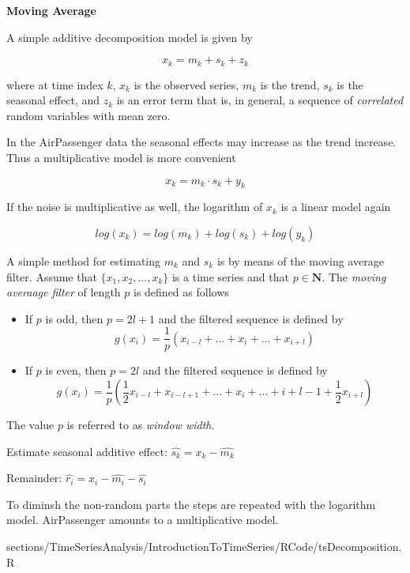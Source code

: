		\RTheory
		{
			\textbf{Moving Average}
			
			\vfill
			
			A simple additive decomposition model is given by
			
			$$x_k = m_k + s_k + z_k $$
			
			where at time index $k$, $x_k$ is the observed series, $m_k$ is the trend,  $s_k$ is the seasonal effect, and $z_k$ is an error term that is, in general, a sequence of \textit{correlated} random variables with mean zero.
			
			\vfill
			
			\hfill
			
			\break
			
			In the AirPassenger data the seasonal effects may increase as the trend increase. Thus a multiplicative model is more convenient
			
			$$ x_k = m_k \cdot s_k + y_k $$
			
			If the noise is multiplicative as well, the logarithm of $x_k$ is a linear model again
			
			$$log(x_k) = log(m_k) + log(s_k) + log(y_k) $$
			
			A simple method for estimating $m_k$ and $s_k$ is by means of the moving average filter. Assume that $\{x_1,x_2,...,x_k \}$ is a time series and that $p \in \mathbf{N}$. The \textit{moving averaage filter} of length $p$ is defined as follows
			
			\begin{itemize}
				\item  If $p$ is odd, then $p=2l + 1$ and the filtered sequence is defined by
				$$ g(x_i)= \frac{1}{p}(x_{i-l}+...+x_i+...+x_{i+l})$$ 
				\item  If $p$ is even, then $p=2l$ and the filtered sequence is defined by
				$$ g(x_i)= \frac{1}{p}(\frac{1}{2}x_{i-l}+x_{i-l+1}+...+x_i+...+{i+l-1}+\frac{1}{2}x_{i+l})$$ 
			\end{itemize}
			
			The value $p$ is referred to as \textit{window width}. 
			
			\vfill
			
			\hfill
			
			\break
			
			Estimate seasonal additive effect: $\hat{s_k}={x_k}-\hat{m_k}$
			
			\vfill
			
			\hfill
			
			\break
			
			Remainder: $\hat{r_i}=x_i-\hat{m_i}-\hat{s_i}$
			
			\vfill
			
			\hfill
			
			\break
			
			To diminsh the non-random parts the steps are repeated with the logarithm model. AirPassenger amounts to a multiplicative model.
		}
		{
			sections/TimeSeriesAnalysis/IntroductionToTimeSeries/RCode/tsDecomposition.R
		}
		

